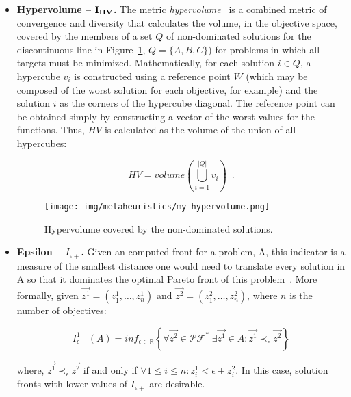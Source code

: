 \begin{itemize}
	
	\item{\bf Hypervolume -- ${\bf I_{HV}}$.} 
	The metric \emph{hypervolume}~\cite{zitzler99multiobjective} is a combined metric of convergence and diversity that calculates the volume, in the objective space, covered by the members of a set $Q$ of non-dominated solutions for the discontinuous line in Figure~\ref{fig:qualityIndicatorHV}, $Q=\{A,B,C\}$) for problems in which all targets must be minimized. Mathematically, for each solution $i\in Q$, a hypercube $v_i$ is constructed using a reference point $W$ (which may be composed of the worst solution for each objective, for example) and the solution $i$ as the corners of the hypercube diagonal. The reference point can be obtained simply by constructing a vector of the worst values for the functions. Thus, $HV$ is calculated as the volume of the union of all hypercubes:
	
	\begin{equation} \label{eq:HV}
	HV = volume\left(\bigcup_{i=1}^{|Q|} v_i \right) \enspace .
	\end{equation}
	
	\begin{figure}[H]
		\centering
		\texttt{[image: img/metaheuristics/my-hypervolume.png]}
		\caption{Hypervolume covered by the non-dominated solutions.} \label{fig:qualityIndicatorHV}
	\end{figure}
	
	\item{\bf Epsilon -- {\bf $I_{\epsilon+}$}.} Given an computed front for a problem, A,
	this indicator is a measure of the smallest distance one would
	need to translate every solution in A so that it dominates the optimal Pareto front
	of this problem~\cite{zitzler03performance}. More formally, given $\vec{z^1} = (z^1_1,\ldots, z^1_n)$ and
	$\vec{z^2} = (z^2_1,\ldots, z^2_n)$, where $n$ is the number of objectives:
	
	\begin{equation}
	I_{\epsilon+}^1(A) = inf_{\epsilon \in \mathbb{R}} \left \{ \forall \vec{z^2} \in \mathcal{PF^*} \;\exists \vec{z^1} \in A: \vec{z^1} \prec_\epsilon 	 \vec{z^2} \right \}
	\end{equation}
	
	\noindent where,
	$ \vec{z^1} \prec_\epsilon \vec{z^2}$ if and only if
	$\forall 1 \leq i \leq n : z^1_i < \epsilon + z^2_i$. In this case, solution fronts with lower values of $I_{\epsilon+}$ are desirable.
	
\end{itemize}


